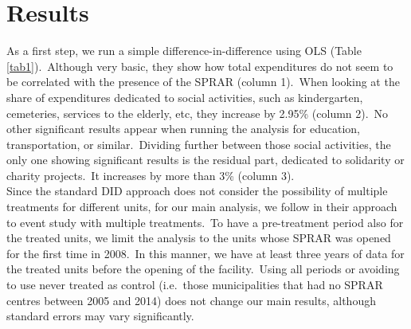\documentclass[authoryear,preprint,review,12pt]{elsarticle}
\begin{document}
\section{Results}

\noindent
As a first step, we run a simple difference-in-difference using OLS (Table \ref{tab1}).\ Although very basic, they show how total expenditures do not seem to be correlated with the presence of the SPRAR (column 1).\ When looking at the share of expenditures dedicated to social activities, such as kindergarten, cemeteries, services to the elderly, etc, they increase by 2.95\% (column 2).\ No other significant results appear when running the analysis for education, transportation, or similar.\ Dividing further between those social activities, the only one showing significant results is the residual part, dedicated to solidarity or charity projects.\ It increases by more than 3\% (column 3).\\

\noindent
Since the standard DID approach does not consider the possibility of multiple treatments for different units, for our main analysis, we follow \cite{clarke2020} in their approach to event study with multiple treatments.\ To have a pre-treatment period also for the treated units, we limit the analysis to the units whose SPRAR was opened for the first time in 2008.\ In this manner, we have at least three years of data for the treated units before the opening of the facility.\ Using all periods or avoiding to use never treated as control (i.e.\ those municipalities that had no SPRAR centres between 2005 and 2014) does not change our main results, although standard errors may vary significantly.\\ 
\end{document}
